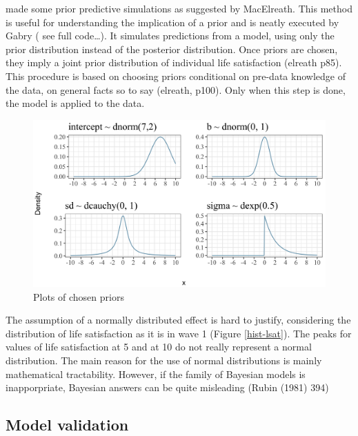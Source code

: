 \documentclass[a4, 12pt]{article}
\begin{document}
made some prior predictive simulations as suggested by MacElreath. This method is useful for understanding the implication of a prior and is neatly executed by Gabry ( see full code\ldots). It simulates predictions from a model, using only the prior distribution instead of the posterior distribution. Once priors are chosen, they imply a joint prior distribution of individual life satisfaction (elreath p85). This procedure is based on choosing priors conditional on pre-data knowledge of the data, on general facts so to say (elreath, p100). Only when this step is done, the model is applied to the data.

\begin{figure}[H]

{\centering \includegraphics[width=0.8\linewidth,]{../figures/plot_priors} 

}

\caption{Plots of chosen priors}\label{fig:chosen-priors}
\end{figure}

The assumption of a normally distributed effect is hard to justify, considering the distribution of life satisfaction as it is in wave 1 (Figure \ref{hist-lsat}). The peaks for values of life satisfaction at 5 and at 10 do not really represent a normal distribution. The main reason for the use of normal distributions is mainly mathematical tractability. However, if the family of Bayesian models is inapporpriate, Bayesian answers can be quite misleading (Rubin (1981) 394)

\hypertarget{model-validation}{%
\subsection{Model validation}\label{model-validation}}
\end{document}

